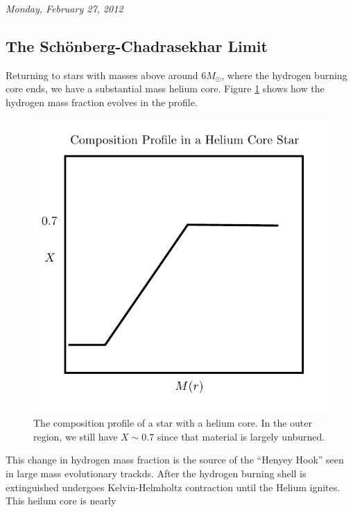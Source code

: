 \documentclass[10pt]{article}
\numberwithin{equation}{section}
\newcommand{\n}{\noindent}
\newcommand{\figref}[1]{Figure \ref{#1}}
\begin{document}
    \n \textit{Monday, February 27, 2012}

    \subsection{The Sch\"onberg-Chadrasekhar Limit}
    \label{sec:schonb-chadr-limit}

    Returning to stars with masses above around $6M_\odot$, where the
    hydrogen burning core ends, we have a substantial mass helium
    core. \figref{fig:3} shows how the hydrogen mass fraction evolves
    in the profile.\\

    \begin{figure}[h!]
      \centering
      \includegraphics{compPlot.pdf}
      \caption{The composition profile of a star with a helium
        core. In the outer region, we still have $X\sim 0.7$ since
        that material is largely unburned.}
      \label{fig:3}
    \end{figure}
    \n This change in hydrogen mass fraction is the source of the
    ``Henyey Hook'' seen in large mass evolutionary trackds. After the
    hydrogen burning shell is extinguished undergoes Kelvin-Helmholtz
    contraction until the Helium ignites. This heilum core is nearly
\end{document}
